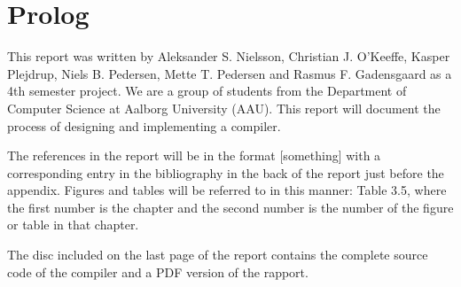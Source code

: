 \section{Prolog}
This report was written by Aleksander S. Nielsson, Christian J. O'Keeffe, Kasper Plejdrup, Niels  B. Pedersen, Mette T. Pedersen and Rasmus F. Gadensgaard as a 4th semester project. We are a group of students from the Department of Computer Science at Aalborg University (AAU). This report will document the process of designing and implementing a compiler.

The references in the report will be in the format [something] with a corresponding entry in the bibliography in the back of the report just before the appendix. Figures and tables will be referred to in this manner: Table 3.5, where the first number is the chapter and the second number is the number of the figure or table in that chapter.

The disc included on the last page of the report contains the complete source code of the compiler and a PDF version of the rapport.

